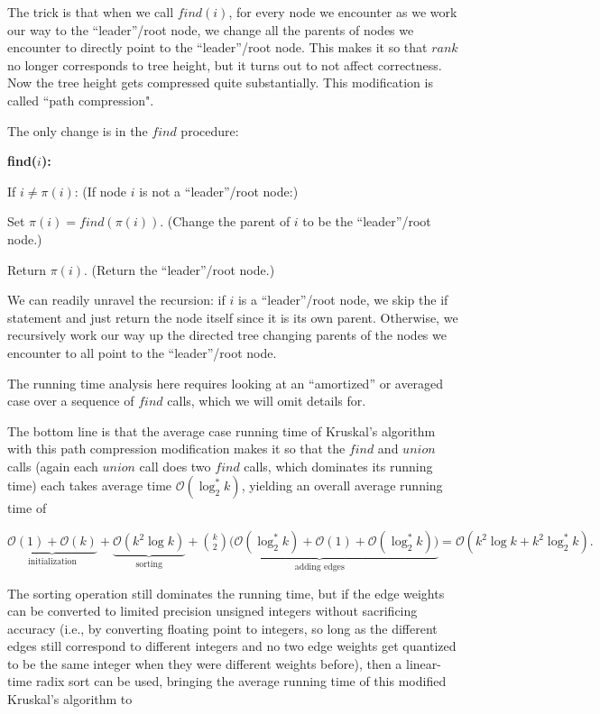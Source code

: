 The trick is that when we call $find(i)$, for every node we encounter as we work our way to the ``leader''/root node, we change all the parents of nodes we encounter to directly point to the ``leader''/root node. This makes it so that $rank$ no longer corresponds to tree height, but it turns out to not affect correctness. Now the tree height gets compressed quite substantially. This modification is called “path compression".

The only change is in the $find$ procedure:

\textbf{find($i$):}

    If $i\ne \pi (i)$: (If node $i$ is not a ``leader''/root node:)

        Set $\pi(i)=find(\pi(i))$. (Change the parent of $i$ to be the ``leader''/root node.)

    Return $\pi(i)$. (Return the ``leader''/root node.)

We can readily unravel the recursion: if $i$ is a ``leader''/root node, we skip the if statement and just return the node itself since it is its own parent. Otherwise, we recursively work our way up the directed tree changing parents of the nodes we encounter to all point to the ``leader''/root node.

The running time analysis here requires looking at an ``amortized'' or averaged case over a sequence of $find$ calls, which we will omit details for.

The bottom line is that the average case running time of Kruskal's algorithm with this path compression modification makes it so that the $find$ and $union$ calls (again each $union$ call does two $find$ calls, which dominates its running time) each takes average time $\mathcal{O}(\log _2^* k)$, yielding an overall average running time of

{\centering$\underbrace{\mathcal{O}(1)+\mathcal{O}(k)}_{\text {initialization}} +\underbrace{\mathcal{O}(k^{2}\log k)}_{\text {sorting}} +\underbrace{{k \choose 2}\big (\mathcal{O}(\log _2^* k)+\mathcal{O}(1)+\mathcal{O}(\log _2^* k)\big )}_{\text {adding edges}} =\mathcal{O}(k^{2}\log k + k^2\log _2^* k).$ \par}
 
The sorting operation still dominates the running time, but if the edge weights can be converted to limited precision unsigned integers without sacrificing accuracy (i.e., by converting floating point to integers, so long as the different edges still correspond to different integers and no two edge weights get quantized to be the same integer when they were different weights before), then a linear-time radix sort can be used, bringing the average running time of this modified Kruskal's algorithm to

